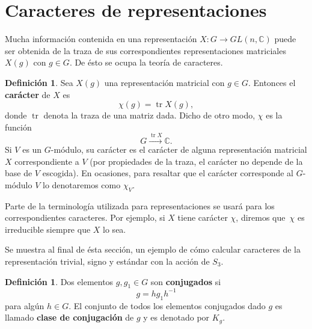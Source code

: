 \documentclass[12pt]{book}
\theoremstyle{definition}
\newtheorem{definition}[theorem]{Definición}
\DeclareMathOperator{\tr}{tr}
\newcounter{in}
\newcounter{ini}
\begin{document}
\section{Caracteres de representaciones}
\label{caracteres}

Mucha información contenida en una representación $X:G\rightarrow
GL(n,\mathbb{C})$ puede ser obtenida de la traza de sus
correspondientes representaciones matriciales $X(g)$ con $g\in G$. De
ésto se ocupa la teoría de caracteres.

\begin{definition}
  Sea $X(g)$ una representación matricial con $g\in G$. Entonces el \textbf{carácter} de $X$ es
  \begin{equation*}
    \chi(g)=\tr X(g),
  \end{equation*}
  donde $\tr$ denota la traza de una matriz dada. Dicho de otro modo,
  $\chi$ es la función
\begin{equation*}
  G\stackrel{\tr X}{\rightarrow}\mathbb{C}.
\end{equation*}
Si $V$ es un $G$-módulo, su carácter es el carácter de alguna
representación matricial $X$ correspondiente a $V$ (por propiedades de
la traza, el carácter no depende de la base de $V$ escogida). En ocasiones, para resaltar
que el carácter corresponde al $G$-módulo $V$ lo denotaremos como $\chi_{V}$.
\end{definition}

Parte de la terminología utilizada para representaciones se
usará para los correspondientes caracteres. Por ejemplo, si $X$ tiene
carácter $\chi$, diremos que~$\chi$ es irreducible siempre que $X$ lo
sea.

Se muestra al final de ésta sección, un ejemplo de cómo calcular caracteres de la representación
trivial, signo y estándar con la acción de $S_{3}$.
\begin{definition}
  Dos elementos $g,g_{1}\in G$ son \textbf{conjugados} si
  \begin{equation*}
  g=hg_{1}h^{-1}
\end{equation*}
para algún $h\in G$. El conjunto de todos los elementos conjugados
dado $g$ es llamado \textbf{clase de conjugación} de $g$ y es
denotado por $K_{g}$.
\end{definition}
\end{document}
